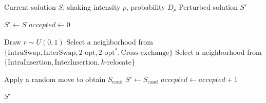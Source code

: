 \documentclass{article}
\begin{document}
\begin{algorithm}[H]
\caption{Shaking Procedure}
\begin{algorithmic}[1]
\Require Current solution $S$, shaking intensity $p$, probability $D_p$
\Ensure Perturbed solution $S'$

\State $S' \gets S$
\State $accepted \gets 0$

    \State Draw $r \sim U(0,1)$
        \State Select a neighborhood from $\{\text{IntraSwap}, \text{InterSwap}, 2\text{-opt}, 2\text{-opt}^*, \text{Cross-exchange}\}$
    \Else
        \State Select a neighborhood from $\{\text{IntraInsertion}, \text{InterInsertion}, k\text{-relocate}\}$
    \EndIf

    \State Apply a random move to obtain $S_{\text{cand}}$
            \State $S' \gets S_{\text{cand}}$
            \State $accepted \gets accepted + 1$
        \EndIf
    \EndIf
\EndWhile

\State \Return $S'$
\end{algorithmic}
\end{algorithm}
\end{document}
